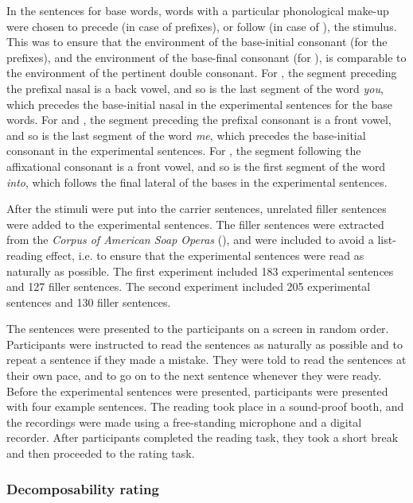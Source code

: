 In the sentences for base words, words with a particular phonological make-up were chosen to precede (in case of prefixes), or follow (in case of ), the stimulus. This was to ensure that the environment of the base-initial consonant (for the prefixes), and the environment of the base-final consonant (for ), is comparable to the environment of the pertinent double consonant.
For , the segment preceding the prefixal nasal is a back vowel, and so is the last segment of the word \textit{you}, which precedes the base-initial nasal in the experimental sentences for the base words. 
For  and , the segment preceding the prefixal consonant is a front vowel, and so is the last segment of the word \textit{me}, which precedes the base-initial consonant in the experimental sentences. 
For , the segment following the affixational consonant is a front vowel, and so is the first segment of the word \textit{into}, which follows the final lateral of the bases in the experimental sentences. 




After the stimuli were put into the carrier sentences, unrelated filler sentences were added to the experimental sentences. The filler sentences were extracted from the \textit{Corpus of American Soap Operas} (\citealt{Davies.2011}), and were included  to avoid a list-reading effect, i.e. to ensure that the experimental sentences were read as naturally as possible. The first experiment included 183 experimental sentences and 127 filler sentences. The second experiment included 205 experimental sentences and 130 filler sentences. 

The sentences were presented to the participants on a screen in random order. 
Participants were instructed to read the sentences as naturally as possible and to repeat a sentence if they made a mistake. They were told to read the sentences at their own pace, and to go on to the next sentence whenever they were ready. Before the experimental sentences were presented, participants were presented with four example sentences. 
The reading took place in a sound-proof booth, and the recordings were made using a free-standing microphone and a digital recorder.
 After participants completed the reading task, they took a short break and then proceeded to the rating task.




\subsubsection{Decomposability rating}



